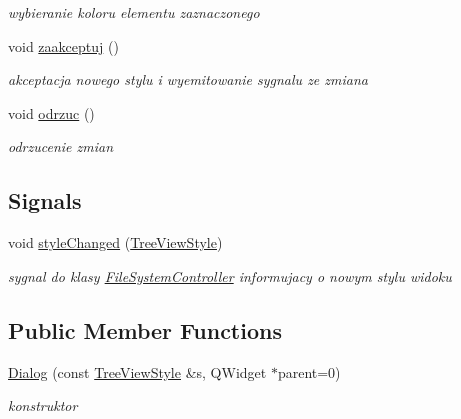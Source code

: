 \begin{DoxyCompactItemize}
\begin{DoxyCompactList}\small\item\em wybieranie koloru elementu zaznaczonego \item\end{DoxyCompactList}\item 
\hypertarget{class_dialog_a0b029d6ee8475a972814bb4fe12975e4}{
void \hyperlink{class_dialog_a0b029d6ee8475a972814bb4fe12975e4}{zaakceptuj} ()}
\label{class_dialog_a0b029d6ee8475a972814bb4fe12975e4}

\begin{DoxyCompactList}\small\item\em akceptacja nowego stylu i wyemitowanie sygnalu ze zmiana \item\end{DoxyCompactList}\item 
\hypertarget{class_dialog_a5050bc1d704cc2c92414b2c762a7ec7b}{
void \hyperlink{class_dialog_a5050bc1d704cc2c92414b2c762a7ec7b}{odrzuc} ()}
\label{class_dialog_a5050bc1d704cc2c92414b2c762a7ec7b}

\begin{DoxyCompactList}\small\item\em odrzucenie zmian \item\end{DoxyCompactList}\end{DoxyCompactItemize}
\subsection*{Signals}
\begin{DoxyCompactItemize}
\item 
void \hyperlink{class_dialog_a96480171d970d3d15e39f3b01dc10894}{styleChanged} (\hyperlink{class_tree_view_style}{TreeViewStyle})
\begin{DoxyCompactList}\small\item\em sygnal do klasy \hyperlink{class_file_system_controller}{FileSystemController} informujacy o nowym stylu widoku \item\end{DoxyCompactList}\end{DoxyCompactItemize}
\subsection*{Public Member Functions}
\begin{DoxyCompactItemize}
\item 
\hyperlink{class_dialog_a7126b5b97e2fde00ab45e9c62dcd4db3}{Dialog} (const \hyperlink{class_tree_view_style}{TreeViewStyle} \&s, QWidget $\ast$parent=0)
\begin{DoxyCompactList}\small\item\em konstruktor \item\end{DoxyCompactList}\end{DoxyCompactItemize}


